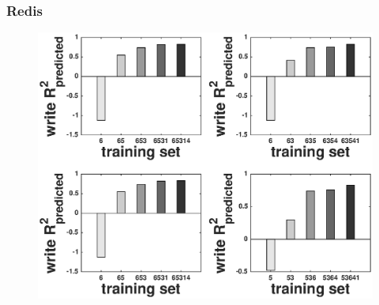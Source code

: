 \documentclass{beamer}
\begin{document}
\begin{frame}
\frametitle{Redis}
  \begin{figure}
    \centering
    \includegraphics[scale = 0.4]{bar_write_avg_latency.eps}
  \end{figure}
\end{frame}
\end{document}
